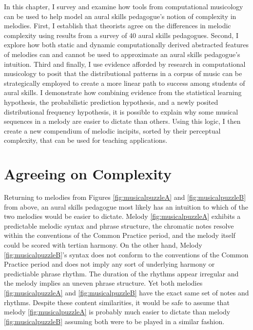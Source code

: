 \documentclass[12pt,]{book}
\begin{document}
In this chapter, I survey and examine how tools from computational musicology can be used to help model an aural skills pedagogue's notion of complexity in melodies.
First, I establish that theorists agree on the differences in melodic complexity using results from a survey of 40 aural skills pedagogues.
Second, I explore how both static and dynamic computationally derived abstracted features of melodies can and cannot be used to approximate an aural skills pedagogue's intuition.
Third and finally, I use evidence afforded by research in computational musicology to posit that the distributional patterns in a corpus of music can be strategically employed to create a more linear path to success among students of aural skills.
I demonstrate how combining evidence from the statistical learning hypothesis, the probabilistic prediction hypothesis, and a newly posited distributional frequency hypothesis, it is possible to explain why some musical sequences in a melody are easier to dictate than others.
Using this logic, I then create a new compendium of melodic incipits, sorted by their perceptual complexity, that can be used for teaching applications.

\hypertarget{agreeing-on-complexity}{%
\section{Agreeing on Complexity}\label{agreeing-on-complexity}}

Returning to melodies from Figures \ref{fig:musicalpuzzleA} and \ref{fig:musicalpuzzleB} from above, an aural skills pedagogue most likely has an intuition to which of the two melodies would be easier to dictate.
Melody \ref{fig:musicalpuzzleA} exhibits a predictable melodic syntax and phrase structure, the chromatic notes resolve within the conventions of the Common Practice period, and the melody itself could be scored with tertian harmony.
On the other hand, Melody \ref{fig:musicalpuzzleB}'s syntax does not conform to the conventions of the Common Practice period and does not imply any sort of underlying harmony or predictiable phrase rhythm.
The duration of the rhythms appear irregular and the melody implies an uneven phrase structure.
Yet both melodies \ref{fig:musicalpuzzleA} and \ref{fig:musicalpuzzleB} have the exact same set of notes and rhythms.
Despite these content similarities, it would be safe to assume that melody \ref{fig:musicalpuzzleA} is probably much easier to dictate than melody \ref{fig:musicalpuzzleB} assuming both were to be played in a similar fashion.
\end{document}
